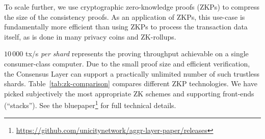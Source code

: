 \documentclass{article}
\begin{document}
To scale further, we use cryptographic zero-knowledge proofs (ZKPs) to compress the size of the consistency proofs. As an application of ZKPs, this use-case is fundamentally more efficient than using ZKPs to process the transaction data itself, as is done in many privacy coins and ZK-rollups.

$10\,000$ tx/s \emph{per shard} represents the proving throughput achievable on a single consumer-class computer. Due to the small proof size and efficient verification, the Consensus Layer can support a practically unlimited number of such trustless shards. Table~\ref{tab:zk-comparison} compares different ZKP technologies. We have picked subjectively the most appropriate ZK schemes and supporting front-ends (``stacks''). See the bluepaper\footnote{\url{https://github.com/unicitynetwork/aggr-layer-paper/releases}} for full technical details.
\end{document}

